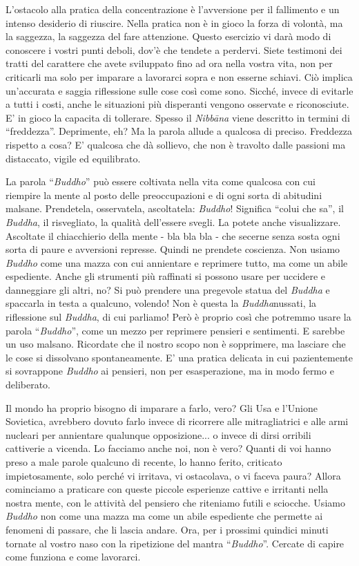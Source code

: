 L'ostacolo alla pratica della concentrazione è l'avversione per il
fallimento e un intenso desiderio di riuscire. Nella pratica non è in
gioco la forza di volontà, ma la saggezza, la saggezza del fare
attenzione. Questo esercizio vi darà modo di conoscere i vostri punti
deboli, dov'è che tendete a perdervi. Siete testimoni dei tratti del
carattere che avete sviluppato fino ad ora nella vostra vita, non per
criticarli ma solo per imparare a lavorarci sopra e non esserne schiavi.
Ciò implica un'accurata e saggia riflessione sulle cose così come sono.
Sicché, invece di evitarle a tutti i costi, anche le situazioni più
disperanti vengono osservate e riconosciute. E' in gioco la capacita di
tollerare. Spesso il \textit{Nibbāna} viene descritto in termini di ``freddezza''.
Deprimente, eh? Ma la parola allude a qualcosa di preciso. Freddezza
rispetto a cosa? E' qualcosa che dà sollievo, che non è travolto dalle
passioni ma distaccato, vigile ed equilibrato.

La parola ``\textit{Buddho}'' può essere coltivata nella vita come qualcosa con cui
riempire la mente al posto delle preoccupazioni e di ogni sorta di
abitudini malsane. Prendetela, osservatela, ascoltatela: \textit{Buddho}!
Significa ``colui che sa'', il \textit{Buddha}, il risvegliato, la qualità
dell'essere svegli. La potete anche visualizzare. Ascoltate il
chiacchierio della mente - bla bla bla - che secerne senza sosta ogni
sorta di paure e avversioni represse. Quindi ne prendete coscienza. Non
usiamo \textit{Buddho} come una mazza con cui annientare e reprimere tutto, ma
come un abile espediente. Anche gli strumenti più raffinati si possono
usare per uccidere e danneggiare gli altri, no? Si può prendere una
pregevole statua del \textit{Buddha} e spaccarla in testa a qualcuno, volendo!
Non è questa la \textit{Buddha}nussati, la riflessione sul \textit{Buddha}, di cui
parliamo! Però è proprio così che potremmo usare la parola ``\textit{Buddho}'',
come un mezzo per reprimere pensieri e sentimenti. E sarebbe un uso
malsano. Ricordate che il nostro scopo non è sopprimere, ma lasciare che
le cose si dissolvano spontaneamente. E' una pratica delicata in cui
pazientemente si sovrappone \textit{Buddho} ai pensieri, non per esasperazione,
ma in modo fermo e deliberato.

Il mondo ha proprio bisogno di imparare a farlo, vero? Gli Usa e
l'Unione Sovietica, avrebbero dovuto farlo invece di ricorrere alle
mitragliatrici e alle armi nucleari per annientare qualunque
opposizione... o invece di dirsi orribili cattiverie a vicenda. Lo
facciamo anche noi, non è vero? Quanti di voi hanno preso a male parole
qualcuno di recente, lo hanno ferito, criticato impietosamente, solo
perché vi irritava, vi ostacolava, o vi faceva paura? Allora cominciamo
a praticare con queste piccole esperienze cattive e irritanti nella
nostra mente, con le attività del pensiero che riteniamo futili e
sciocche. Usiamo \textit{Buddho} non come una mazza ma come un abile espediente
che permette ai fenomeni di passare, che li lascia andare. Ora, per i
prossimi quindici minuti tornate al vostro naso con la ripetizione del
mantra ``\textit{Buddho}''. Cercate di capire come funziona e come lavorarci.

